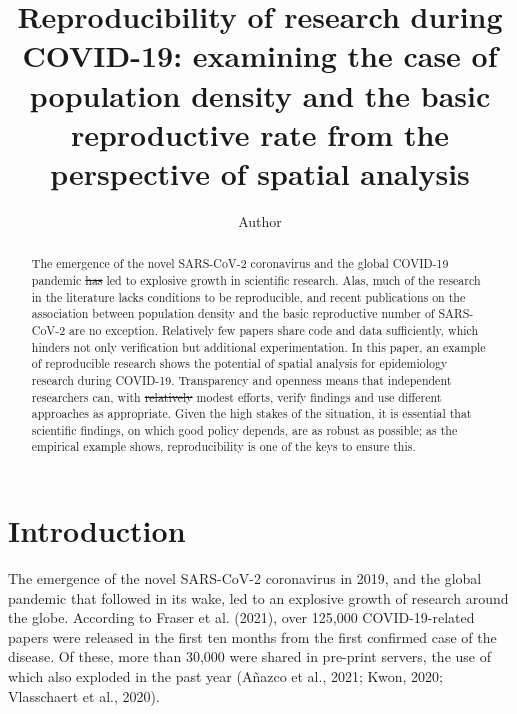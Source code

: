 \documentclass[]{elsarticle} %
\providecommand{\DIFaddtex}[1]{{\protect\color{blue}\uwave{#1}}} %
\providecommand{\DIFdeltex}[1]{{\protect\color{red}\sout{#1}}}                      %
\providecommand{\DIFaddbegin}{} %
\providecommand{\DIFaddend}{} %
\providecommand{\DIFdelbegin}{} %
\providecommand{\DIFdelend}{} %
\providecommand{\DIFadd}[1]{\texorpdfstring{\DIFaddtex{#1}}{#1}} %
\providecommand{\DIFdel}[1]{\texorpdfstring{\DIFdeltex{#1}}{}} %
\newcommand{\DIFscaledelfig}{0.5}
\newlength{\DIFdelgraphicswidth} %
\newlength{\DIFdelgraphicsheight} %
\newcommand{\DIFaddincludegraphics}[2][]{{\color{blue}\fbox{\DIFOincludegraphics[#1]{#2}}}} %
\newcommand{\DIFdelincludegraphics}[2][]{%
\sbox{\DIFdelgraphicsbox}{\DIFOincludegraphics[#1]{#2}}%
\settoboxwidth{\DIFdelgraphicswidth}{\DIFdelgraphicsbox} %
\settoboxtotalheight{\DIFdelgraphicsheight}{\DIFdelgraphicsbox} %
\scalebox{\DIFscaledelfig}{%
\parbox[b]{\DIFdelgraphicswidth}{\usebox{\DIFdelgraphicsbox}\\[-\baselineskip] \rule{\DIFdelgraphicswidth}{0em}}\llap{\resizebox{\DIFdelgraphicswidth}{\DIFdelgraphicsheight}{%
\setlength{\unitlength}{\DIFdelgraphicswidth}%
\begin{picture}(1,1)%
\thicklines\linethickness{2pt} %
{\color[rgb]{1,0,0}\put(0,0){\framebox(1,1){}}}%
{\color[rgb]{1,0,0}\put(0,0){\line( 1,1){1}}}%
{\color[rgb]{1,0,0}\put(0,1){\line(1,-1){1}}}%
\end{picture}%
}\hspace*{3pt}}} %
} %
\DeclareRobustCommand{\DIFaddbegin}{\DIFOaddbegin \let\includegraphics\DIFaddincludegraphics} %
\DeclareRobustCommand{\DIFaddend}{\DIFOaddend \let\includegraphics\DIFOincludegraphics} %
\DeclareRobustCommand{\DIFdelbegin}{\DIFOdelbegin \let\includegraphics\DIFdelincludegraphics} %
\DeclareRobustCommand{\DIFdelend}{\DIFOaddend \let\includegraphics\DIFOincludegraphics} %
\begin{document}
\begin{frontmatter}

  \title{Reproducibility of research during COVID-19: examining the case
of population density and the basic reproductive rate from the
perspective of spatial analysis}
    \author[University]{Author}
      \address[University]{Department, Street, City, State ZIP}

  \begin{abstract}
  The emergence of the novel SARS-CoV-2 coronavirus and the global
  COVID-19 pandemic \DIFdelbegin \DIFdel{has }\DIFdelend \DIFaddbegin \DIFadd{in 2019 }\DIFaddend led to explosive growth in scientific
  research. Alas, much of the research in the literature lacks
  conditions to be reproducible, and recent publications on the
  association between population density and the basic reproductive
  number of SARS-CoV-2 are no exception. Relatively few papers share
  code and data sufficiently, which hinders not only verification but
  additional experimentation. In this paper, an example of reproducible
  research shows the potential of spatial analysis for epidemiology
  research during COVID-19. Transparency and openness means that
  independent researchers can, with \DIFdelbegin \DIFdel{relatively }\DIFdelend \DIFaddbegin \DIFadd{only }\DIFaddend modest efforts, verify findings
  and use different approaches as appropriate. Given the high stakes of
  the situation, it is essential that scientific findings, on which good
  policy depends, are as robust as possible; as the empirical example
  shows, reproducibility is one of the keys to ensure this.
  \end{abstract}

 \end{frontmatter}

\newpage

\hypertarget{introduction}{%
\section{Introduction}\label{introduction}}

The emergence of the novel SARS-CoV-2 coronavirus in 2019, and the
global pandemic that followed in its wake, led to an explosive growth of
research around the globe. According to Fraser et al. (2021), over
125,000 COVID-19-related papers were released in the first ten months
from the first confirmed case of the disease. Of these, more than 30,000
were shared in pre-print servers, the use of which also exploded in the
past year (Añazco et al., 2021; Kwon, 2020; Vlasschaert et al., 2020).
\end{document}
